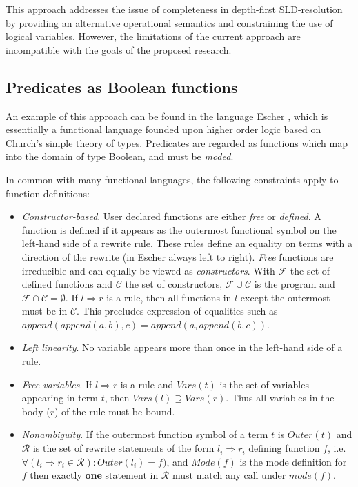 This approach addresses the issue of completeness in depth-first SLD-resolution by providing
an alternative operational semantics and constraining the use of logical variables.
However, the
limitations of the current approach are incompatible with the goals of the proposed research.

\subsection{Predicates as Boolean functions}

An example of this approach can be found in the language Escher \cite{Llo94},  which is
essentially a functional language
founded upon higher order logic based on Church's simple theory of types.  Predicates are
regarded as functions which map into the domain of type Boolean, and must be \textit{moded}.

In common with many functional languages, the following constraints apply to function
definitions:

\begin{itemize}

\item{\textit{Constructor-based}. 
  User declared functions are either \textit{free} or \textit{defined}.  A function is defined if
  it appears as the outermost functional symbol on the left-hand side of a rewrite rule.
  These rules define an equality on terms
  with a direction of the rewrite (in Escher always left to right).
  \textit{Free} functions are irreducible and can
  equally be viewed as \textit{constructors}.  With $\mathcal{F}$ the set of defined functions
  and $\mathcal{C}$
  the set of constructors, $\mathcal{F} \cup \mathcal{C}$ is the program and
  $\mathcal{F} \cap \mathcal{C} = \emptyset$.
  If $l \Rightarrow r$ is a rule, then all
  functions in $l$ except the outermost must be in $\mathcal{C}$.
  This precludes expression of equalities such as
  $\mathit{append}(\mathit{append}(a,b),c) = \mathit{append}(a,\mathit{append}(b,c))$.
  }
\item{\textit{Left linearity}.
  No variable appears more than once in the left-hand side of a rule.
  }
\item{\textit{Free variables}.  If $l \Rightarrow r$ is a rule and $Vars(t)$ is the set of
  variables appearing in term $t$, then $\mathit{Vars}(l) \supseteq \mathit{Vars}(r)$.
  Thus all variables in the
  body ($r$) of the rule must be bound.
  }
\item{\textit{Nonambiguity}.  
  If the outermost function symbol of a term $t$ is $\mathit{Outer}(t)$ and
  $\mathcal{R}$ is the set of rewrite statements of the form
  $l_i \Rightarrow r_i$ defining function $f$, i.e. $\forall (l_i \Rightarrow r_i \in
  \mathcal{R}): \mathit{Outer}(l_i) = f)$, and $\mathit{Mode}(f)$ is the mode definition for
  $f$ then exactly \textbf{one} statement in $\mathcal{R}$ must match any call under
  $mode(f)$.
  }

\end{itemize}

